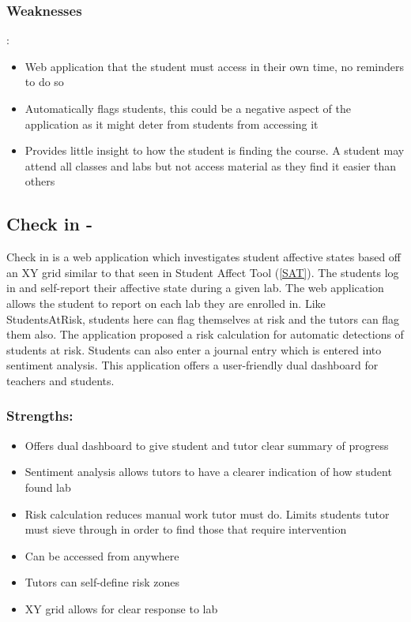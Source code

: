 \documentclass{l4proj}
\begin{document}
\subsubsection{Weaknesses}:
\begin{itemize}
    \item Web application that the student must access in their own time, no reminders to do so
    \item Automatically flags students, this could be a negative aspect of the application as it might deter from students from accessing it
    \item Provides little insight to how the student is finding the course. A student may attend all classes and labs but not access material as they find it easier than others

\end{itemize}


\label{check}\subsection{Check in - \cite{ada_using_2021}}
Check in is a web application which investigates student affective states based off an XY grid similar to that seen in Student Affect Tool (\ref{SAT}). The students log in and self-report their affective state during a given lab. The web application allows the student to report on each lab they are enrolled in. Like StudentsAtRisk, students here can flag themselves at risk and the tutors can flag them also. The application proposed a risk calculation for automatic detections of students at risk. Students can also enter a journal entry which is entered into sentiment analysis. This application offers a user-friendly dual dashboard for teachers and students.

\subsubsection{Strengths:}
\begin{itemize}
    \item Offers dual dashboard to give student and tutor clear summary of progress
    \item Sentiment analysis allows tutors to have a clearer indication of how student found lab
    \item Risk calculation reduces manual work tutor must do. Limits students tutor must sieve through in order to find those that require intervention
    \item Can be accessed from anywhere
    \item Tutors can self-define risk zones 
    \item XY grid allows for clear response to lab
\end{itemize}
\end{document}
